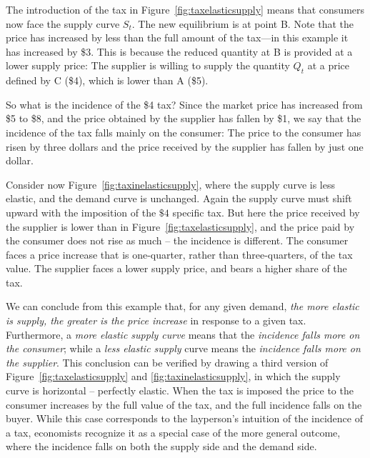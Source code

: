 

\newhtmlpage

The introduction of the tax in Figure~\ref{fig:taxelasticsupply} means that
consumers now face the supply curve $S_t$. The new equilibrium is at point
B. Note that the price has increased by less than the full amount of the
tax---in this example it has increased by \$3. This is because the reduced
quantity at B is provided at a lower supply price: The supplier is willing
to supply the quantity $Q_t$ at a price defined by C (\$4), which is
lower than A (\$5).

So what is the incidence of the \$4 tax? Since the market price has
increased from \$5 to \$8, and the price obtained by the supplier has
fallen by \$1, we say that the incidence of the tax falls mainly on the
consumer: The price to the consumer has risen by three dollars and the price
received by the supplier has fallen by just one dollar.

Consider now Figure~\ref{fig:taxinelasticsupply}, where the supply curve is
less elastic, and the demand curve is unchanged. Again the supply curve must
shift upward with the imposition of the $\$4$ specific tax. But here the
price received by the supplier is lower than in Figure~\ref{fig:taxelasticsupply},
and the price paid by the consumer does not rise as
much -- the incidence is different. The consumer faces a price increase that
is one-quarter, rather than three-quarters, of the tax value. The supplier
faces a lower supply price, and bears a higher share of the tax.



\newhtmlpage

We can conclude from this example that, for any given demand, \textit{the
more elastic is supply, the greater is the price increase} in response to a
given tax. Furthermore, a \textit{more elastic supply curve} means that the 
\textit{incidence falls more on the consumer}; while a \textit{less elastic
supply} curve means the \textit{incidence falls more on the supplier}. This
conclusion can be verified by drawing a third version of Figure~\ref{fig:taxelasticsupply}
and \ref{fig:taxinelasticsupply}, in which the supply
curve is horizontal -- perfectly elastic. When the tax is imposed the price
to the consumer increases by the full value of the tax, and the full
incidence falls on the buyer. While this case corresponds to the layperson's
intuition of the incidence of a tax, economists recognize it as a special
case of the more general outcome, where the incidence falls on both the
supply side and the demand side.

